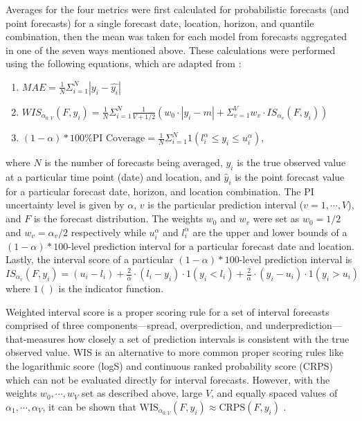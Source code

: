 \documentclass[thesis]{umassthesis}  %
\begin{document}
Averages for the four metrics were first calculated for probabilistic forecasts (and point forecasts) for a single forecast date, location, horizon, and quantile combination, then the mean was taken for each model from forecasts aggregated in one of the seven ways mentioned above. These calculations were performed using the following equations, which are adapted from \cite{cramer}:
\begin{enumerate}
\item $MAE = \frac{1}{N} \Sigma_{i=1}^N |y_i-\hat{y_i}|$
\item $WIS_{{\alpha}_{0:V}} (F, y_i) = \frac{1}{N} \Sigma_{i=1}^N \frac{1}{V+1/2}(w_0\cdot |y_i - m| + \Sigma_{v = 1}^V w_v \cdot IS_{{\alpha}_v}(F, y_i))$
\item $(1 - \alpha)*100 \textrm{\% PI Coverage} = \frac{1}{N} \Sigma_{i=1}^N 1(l_i^{\alpha} \leq y_i \leq u_i^{\alpha}),$
\end{enumerate}
where $N$ is the number of forecasts being averaged, $y_i$ is the true observed value at a particular time point (date) and location, and $\hat{y}_i$ is the point forecast value for a particular forecast date, horizon, and location combination. The PI uncertainty level is given by $\alpha$, $v$ is the particular prediction interval ($v = 1, \cdots, V$), and $F$ is the forecast distribution. The weights $w_0$ and $w_v$ were set as $w_0 = 1/2$ and $w_v = \alpha_v/2$ respectively while $u_i^{\alpha}$ and $l_i^{\alpha}$ are the upper and lower bounds of a $(1 - \alpha) * 100$-level prediction interval for a particular forecast date and location. Lastly, the interval score of a particular $(1 - \alpha) * 100$-level prediction interval is $IS_{{\alpha}_v}(F, y_i) = (u_i-l_i) + \frac{2}{\alpha} \cdot (l_i-y_i) \cdot 1(y_i < l_i) + \frac{2}{\alpha} \cdot (y_i - u_i) \cdot 1(y_i > u_i)$ where $1()$ is the indicator function\cite{cramer}.

Weighted interval score is a proper scoring rule for a set of interval forecasts comprised of three components---spread, overprediction, and underprediction---that-measures how closely a set of prediction intervals is consistent with the true observed value. WIS is an alternative to more common proper scoring rules like the logarithmic score (logS) and continuous ranked probability score (CRPS) which can not be evaluated directly for interval forecasts. However, with the weights $w_0, \cdots, w_V$ set as described above, large $V$, and equally spaced values of $\alpha_1, \cdots, \alpha_V$, it can be shown that $\textrm{WIS}_{\alpha_{0:V}}(F, y_i) \approx \textrm{CRPS}(F, y_i)$ \cite{int_eval}.
\end{document}

